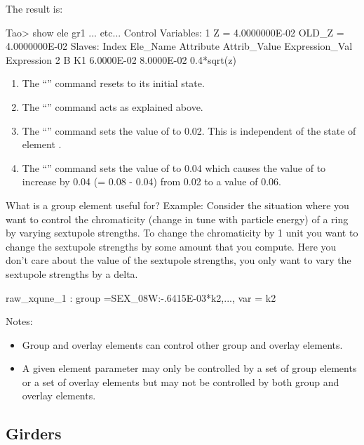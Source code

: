 \documentclass{hitec}
\begin{document}
The result is:

\begin{code}
Tao> show ele gr1
... etc...
Control Variables:
    1   Z  =  4.0000000E-02           OLD_Z  =  4.0000000E-02
Slaves:
   Index   Ele_Name  Attribute   Attrib_Value  Expression_Val    Expression
       2   B         K1            6.0000E-02      8.0000E-02    0.4*sqrt(z)
\end{code}
\begin{enumerate}
\item
The ``'' command resets \tao to its initial state.
\item
The ``'' command acts as explained above.
\item
The ``'' command sets the value of  to 0.02. This is independent of the state of element .
\item
The ``'' command sets the value of  to 0.04 which causes the
value of  to increase by 0.04 (= 0.08 - 0.04) from 0.02 to a value of 0.06.
\end{enumerate}

What is a group element useful for? Example: Consider the situation where you want to control the
chromaticity (change in tune with particle energy) of a ring by varying sextupole strengths. To
change the chromaticity by 1 unit you want to change the sextupole strengths by some amount that you
compute. Here you don't care about the value of the sextupole strengths, you only want to vary the
sextupole strengths by a delta.

\begin{code} 
raw_xqune_1 : group ={SEX_08W:-.6415E-03*k2,...}, var = {k2}
\end{code}

Notes:
\begin{itemize}
\item
Group and overlay elements can control other group and overlay elements.
\item
A given element parameter may only be controlled by a set of group elements or a set of overlay
elements but may not be controlled by both group and overlay elements.
\end{itemize}

\subsection{Girders}
\end{document}
